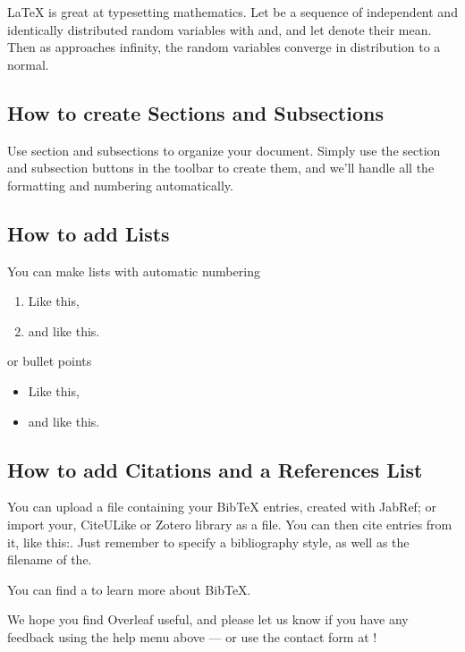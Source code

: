 \documentclass[a4paper]{article}
\begin{document}
\LaTeX{} is great at typesetting mathematics. Let be a sequence of independent and identically distributed random variables with and, and let
denote their mean. Then as approaches infinity, the random variables converge in distribution to a normal.


\subsection{How to create Sections and Subsections}

Use section and subsections to organize your document. Simply use the section and subsection buttons in the toolbar to create them, and we'll handle all the formatting and numbering automatically.

\subsection{How to add Lists}

You can make lists with automatic numbering 

\begin{enumerate}
\item Like this,
\item and like this.
\end{enumerate}
 or bullet points 
\begin{itemize}
\item Like this,
\item and like this.
\end{itemize}

\subsection{How to add Citations and a References List}

You can upload a file containing your BibTeX entries, created with JabRef; or import your, CiteULike or Zotero library as a file. You can then cite entries from it, like this:. Just remember to specify a bibliography style, as well as the filename of the.

You can find a to learn more about BibTeX.

We hope you find Overleaf useful, and please let us know if you have any feedback using the help menu above --- or use the contact form at !
\end{document}
